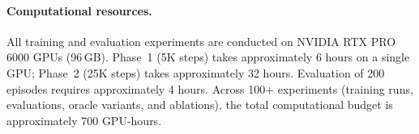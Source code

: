 \paragraph{Computational resources.}
All training and evaluation experiments are conducted on NVIDIA RTX PRO 6000 GPUs (96\,GB). Phase~1 (5K steps) takes approximately 6 hours on a single GPU; Phase~2 (25K steps) takes approximately 32 hours. Evaluation of 200 episodes requires approximately 4 hours. Across 100+ experiments (training runs, evaluations, oracle variants, and ablations), the total computational budget is approximately 700 GPU-hours.
